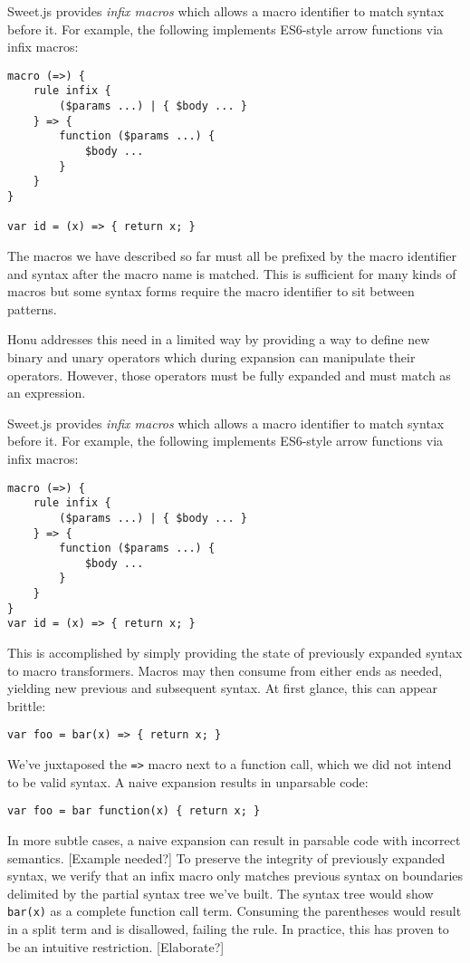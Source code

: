 \documentclass[preprint,10pt]{sigplanconf}
\begin{document}
Sweet.js provides \emph{infix macros} which allows a macro identifier to
match syntax before it. For example, the following implements
ES6-style arrow functions via infix macros:

\begin{verbatim}
macro (=>) {
    rule infix {
        ($params ...) | { $body ... }
    } => {
        function ($params ...) {
            $body ...
        }
    }
}

var id = (x) => { return x; }
\end{verbatim}

The macros we have described so far must all be prefixed by the macro
identifier and syntax after the macro name is matched. This is
sufficient for many kinds of macros but some syntax forms require the
macro identifier to sit between patterns.

Honu addresses this need in a limited way by providing a way to define
new binary and unary operators which during expansion can manipulate
their operators. However, those operators must be fully expanded and
must match as an expression.

Sweet.js provides \emph{infix macros} which allows a macro identifier to
match syntax before it. For example, the following implements
ES6-style arrow functions via infix macros:

\begin{verbatim}
macro (=>) {
    rule infix {
        ($params ...) | { $body ... }
    } => {
        function ($params ...) {
            $body ...
        }
    }
}
var id = (x) => { return x; }
\end{verbatim}

This is accomplished by simply providing the state of previously
expanded syntax to macro transformers. Macros may then consume from
either ends as needed, yielding new previous and subsequent syntax. At
first glance, this can appear brittle:

\begin{verbatim}
var foo = bar(x) => { return x; }
\end{verbatim}

We've juxtaposed the \verb!=>! macro next to a function call, which we did
not intend to be valid syntax. A naive expansion results in unparsable
code:

\begin{verbatim}
var foo = bar function(x) { return x; }
\end{verbatim}

In more subtle cases, a naive expansion can result in parsable code
with incorrect semantics. [Example needed?] To preserve the integrity
of previously expanded syntax, we verify that an infix macro only
matches previous syntax on boundaries delimited by the partial syntax
tree we've built. The syntax tree would show \verb!bar(x)! as a complete
function call term. Consuming the parentheses would result in a split
term and is disallowed, failing the rule. In practice, this has proven
to be an intuitive restriction. [Elaborate?]
\end{document}
